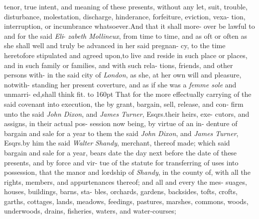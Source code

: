 \documentclass{article}
\begin{document}
\lqq tenor, true intent, and meaning of these\break
\lqq presents, without any let, suit, trouble,\break
\lqq disturbance, molestation, discharge,\break
\lqq hinderance, forfeiture, eviction, vexa-\break
\lqq tion, interruption, or incumbrance\break
\lqq whatsoever.\tsk  And that it shall more-
\lqq over be lawful to and for the said \textit{Eli}-\break
\lqq \textit{zabeth Mollineux}, from time to time,\break
\lqq and as oft or often as she shall well and\break
\lqq truly be advanced in her said pregnan-\break
\lqq cy, to the time heretofore stipulated\break
\lqq and agreed upon,\tsk  to live and reside\break
\lqq in such place or places, and in such\break
\lqq family or families, and with such rela-\break
\lqq tions, friends, and other persons with-\break
\lqq in the said city of \textit{London}, as she, at\break
\lqq her own will and pleasure, notwith-\break
\lqq standing her present coverture, and as\break
\lqq if she was a \textit{femme sole} and unmarri-\break
\lqq ed,\tsk  shall think fit.\tsk {}\hbox{}\break
\lqq {}\hbox to 160pt{}\break
\lqq That for the more effectually carrying\break
\lqq of the said covenant into execution, the\break
\lqq {}\break
\lqq by grant, bargain, sell, release, and con-\break
\lqq firm unto the said \textit{John Dixon}, and\break
\lqq \textit{James Turner}, Esqrs.\@ their heirs, exe-
\lqq cutors, and assigns, in their actual pos-\break
\lqq session now being, by virtue of an in-\break
\lqq denture of bargain and sale for a year\break
\lqq to them the said \textit{John Dixon}, and \textit{James}\break
\lqq \textit{Turner}, Esqrs.\@ by him the said \textit{Walter}\break
\lqq \textit{Shandy}, merchant, thereof made; which\break
\lqq said bargain and sale for a year, bears\break
\lqq date the day next before the date of\break
\lqq these presents, and by force and vir-\break
\lqq tue of the statute for transferring of\break
\lqq uses into possession,\tsk {}\hbox{} that\break
\lqq the manor and lordship of \textit{Shandy}, in\break
\lqq the county of\tsh  , with all the\break
\lqq rights, members, and appurtenances\break
\lqq thereof; and all and every the mes-\break
\lqq suages, houses, buildings, barns, sta-\break
\lqq bles, orchards, gardens, backsides,\break
\lqq tofts, crofts, garths, cottages, lands,\break
\lqq meadows, feedings, pastures, marshes,\break
\lqq commons, woods, underwoods, drains,\break
\lqq fisheries, waters, and water-courses;\tsk{} 
\end{document}
